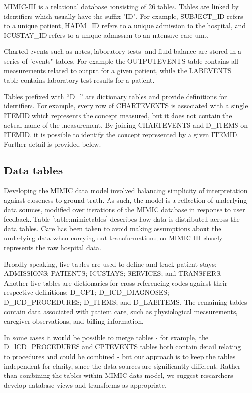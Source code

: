 \documentclass[english]{article}
\begin{document}

MIMIC-III is a relational database consisting of 26 tables. Tables are linked by identifiers which usually have the suffix "ID". For example, SUBJECT\_ID refers to a unique patient, HADM\_ID refers to a unique admission to the hospital, and ICUSTAY\_ID refers to a unique admission to an intensive care unit.

Charted events such as notes, laboratory tests, and fluid balance are stored in a series of "events" tables. For example the OUTPUTEVENTS table contains all measurements related to output for a given patient, while the LABEVENTS table contains laboratory test results for a patient.

Tables prefixed with “D\_” are dictionary tables and provide definitions for identifiers. For example, every row of CHARTEVENTS is associated with a single ITEMID which represents the concept measured, but it does not contain the actual name of the measurement. By joining CHARTEVENTS and D\_ITEMS on ITEMID, it is possible to identify the concept represented by a given ITEMID. Further detail is provided below.

\subsection*{Data tables}

Developing the MIMIC data model involved balancing simplicity of interpretation against closeness to ground truth. As such, the model is a reflection of underlying data sources, modified over iterations of the MIMIC database in response to user feedback. Table \ref{table:mimictables} describes how data is distributed across the data tables. Care has been taken to avoid making assumptions about the underlying data when carrying out transformations, so MIMIC-III closely represents the raw hospital data.

Broadly speaking, five tables are used to define and track patient stays: ADMISSIONS; PATIENTS; ICUSTAYS; SERVICES; and TRANSFERS. Another five tables are dictionaries for cross-referencing codes against their respective definitions: D\_CPT; D\_ICD\_DIAGNOSES; D\_ICD\_PROCEDURES; D\_ITEMS; and D\_LABITEMS. The remaining tables contain data associated with patient care, such as physiological measurements, caregiver observations, and billing information.

In some cases it would be possible to merge tables - for example, the D\_ICD\_PROCEDURES and CPTEVENTS tables both contain detail relating to procedures and could be combined - but our approach is to keep the tables independent for clarity, since the data sources are significantly different. Rather than combining the tables within MIMIC data model, we suggest researchers develop database views and transforms as appropriate.
\end{document}
